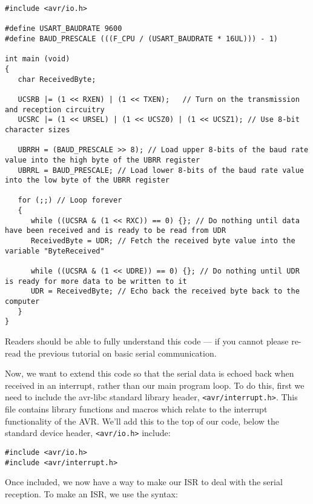 \documentclass[a4paper,oneside,notitlepage]{book}
\begin{document}
\begin{center}
\begin{lstlisting}
#include <avr/io.h>

#define USART_BAUDRATE 9600
#define BAUD_PRESCALE (((F_CPU / (USART_BAUDRATE * 16UL))) - 1)

int main (void)
{
   char ReceivedByte;

   UCSRB |= (1 << RXEN) | (1 << TXEN);   // Turn on the transmission and reception circuitry
   UCSRC |= (1 << URSEL) | (1 << UCSZ0) | (1 << UCSZ1); // Use 8-bit character sizes

   UBRRH = (BAUD_PRESCALE >> 8); // Load upper 8-bits of the baud rate value into the high byte of the UBRR register
   UBRRL = BAUD_PRESCALE; // Load lower 8-bits of the baud rate value into the low byte of the UBRR register

   for (;;) // Loop forever
   {
      while ((UCSRA & (1 << RXC)) == 0) {}; // Do nothing until data have been received and is ready to be read from UDR
      ReceivedByte = UDR; // Fetch the received byte value into the variable "ByteReceived"

      while ((UCSRA & (1 << UDRE)) == 0) {}; // Do nothing until UDR is ready for more data to be written to it
      UDR = ReceivedByte; // Echo back the received byte back to the computer
   }   
}
\end{lstlisting}
\end{center}

Readers should be able to fully understand this code --- if you cannot please re-read the previous tutorial on basic serial communication.

Now, we want to extend this code so that the serial data is echoed back when received in an interrupt, rather than our main program loop. To do this, first we need to include the avr-libc standard library header, \texttt{<avr/interrupt.h>}. This file contains library functions and macros which relate to the interrupt functionality of the AVR. We'll add this to the top of our code, below the standard device header, \texttt{<avr/io.h>}  include:

\begin{center}
\begin{lstlisting}
#include <avr/io.h>
#include <avr/interrupt.h>
\end{lstlisting}
\end{center}

Once included, we now have a way to make our ISR to deal with the serial reception. To make an ISR, we use the syntax:
\end{document}
